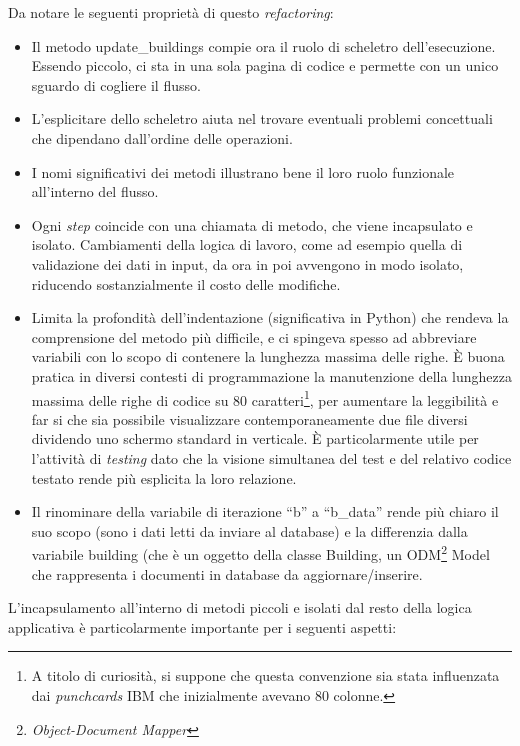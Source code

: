 \documentclass[12pt]{report}
\begin{document}
Da notare le seguenti proprietà di questo \textit{refactoring}:
\begin{itemize}
  \item Il metodo update\_buildings compie ora il ruolo
  di scheletro dell'esecuzione. Essendo piccolo, ci sta in una sola
  pagina di codice e permette con un unico sguardo di cogliere il flusso.
  \item L'esplicitare dello scheletro aiuta nel trovare
   eventuali problemi concettuali che dipendano dall'ordine
   delle operazioni.
  \item I nomi significativi dei metodi illustrano bene il loro 
  ruolo funzionale all'interno del flusso. 
  \item Ogni \textit{step} coincide con una chiamata di metodo, 
  che viene incapsulato e isolato. Cambiamenti della logica di
  lavoro, come ad esempio quella di validazione dei dati in input,
  da ora in poi avvengono in modo isolato, riducendo
  sostanzialmente il costo delle modifiche.
  \item Limita la profondità dell'indentazione (significativa in Python) 
  che rendeva la comprensione del metodo più difficile, e ci spingeva spesso
  ad abbreviare variabili con lo scopo di contenere la lunghezza massima
  delle righe. 
  È buona pratica in diversi contesti di programmazione 
  la manutenzione della lunghezza massima delle righe di codice su 
  80 caratteri\footnote{
  A titolo di curiosità, si suppone che questa convenzione sia stata 
  influenzata dai \textit{punchcards} IBM che inizialmente avevano 80 colonne.
  }, 
  per aumentare la leggibilità e far si che sia possibile visualizzare
  contemporaneamente due file diversi dividendo uno schermo standard
  in verticale. È particolarmente utile per l'attività di \textit{testing} 
  dato che la visione simultanea del test e del relativo codice testato
  rende più esplicita la loro relazione.
  \item Il rinominare della variabile di iterazione ``b'' a ``b\_data'' rende
  più chiaro il suo scopo (sono i dati letti da inviare al database) 
  e la differenzia dalla variabile building (che è un oggetto della
  classe Building, un ODM\footnote{\textit{Object-Document Mapper}} Model che
  rappresenta i documenti in database da aggiornare/inserire. 
\end{itemize}

L'incapsulamento all'interno di metodi piccoli e isolati dal resto della
logica applicativa è particolarmente importante per i seguenti aspetti:
\end{document}
